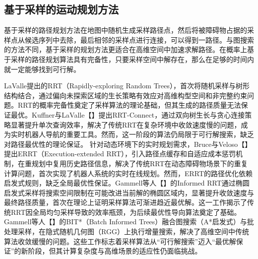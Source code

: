\documentclass[master,academic]{ysuthesis} %
\begin{document}
		\subsection{基于采样的运动规划方法}
		基于采样的路径规划方法在地图中随机生成采样路径点，然后将被障碍物占据的采样点从候选序列中去除，最后相邻的采样点进行连接，可以得到一路径。与图搜索的方法不同，基于采样的规划方法更适合在高维空间中加速求解路径。在概率上基于采样的路径规划算法具有完备性，只要采样空间中解存在，那么在足够的时间内就一定能够找到可行解。

		LaValle提出的RRT（Rapidly-exploring Random Trees），首次将随机采样与树形结构结合，通过偏向未探索区域的生长策略有效应对高维构型空间和非完整约束问题。RRT的概率完备性​奠定了采样算法的理论基础，但其生成的路径质量无法保证最优。Kuffner与LaValle【】提出RRT-Connect，通过双向树生长与贪心连接策略显著提升单次查询效率，解决了传统RRT在复杂环境中收敛速度慢的问题，成为实时机器人导航的重要工具。然而，这一阶段的算法仍局限于可行解搜索，缺乏对路径最优性的理论保证。
		针对动态环境下的实时规划需求，Bruce与Veloso【】提出ERRT（Execution-extended RRT），引入路径点缓存和自适应成本惩罚机制，在重规划中复用历史路径信息，解决了传统RRT在动态障碍物场景下的重复计算问题，首次实现了机器人系统的实时在线规划。然而，ERRT的路径优化依赖启发式规则，缺乏全局最优性保证。Gammell等人【】的Informed RRT​ 通过椭圆启发式采样将搜索空间限制在可能改进当前解的椭圆区域内，显著提升收敛速度与最终路径质量，首次在理论上证明采样算法可渐进趋近最优解。这一工作揭示了传统RRT因全局均匀采样导致的效率瓶颈，为后续最优性导向算法奠定了基础。
		Gammell等人【】的BIT*（Batch Informed Trees）融合图搜索（A*启发式）与批处理采样，在隐式随机几何图（RGG）上执行增量搜索，解决了高维空间中传统算法收敛缓慢的问题。这些工作标志着采样算法从“可行解搜索”迈入“最优解保证”的新阶段，但其计算复杂度与高维场景的适应性仍面临挑战。
\end{document}
